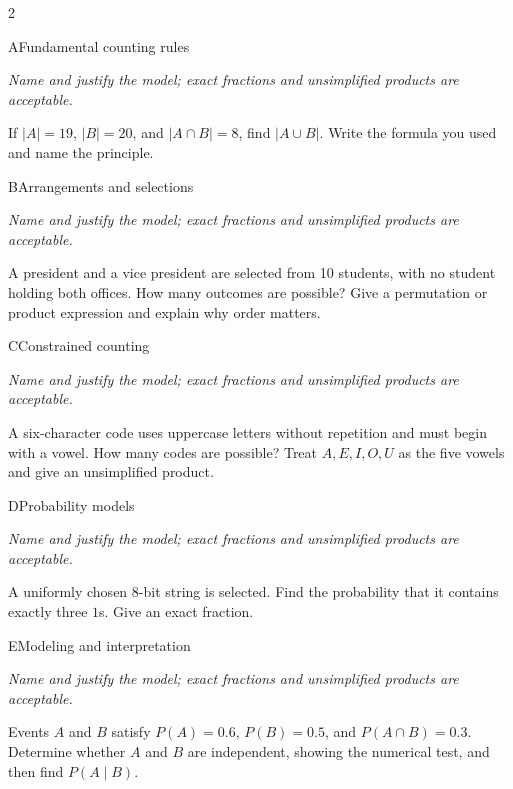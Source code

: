 \documentclass[9pt]{extarticle}
\begin{document}
\CoreWorkArea
\FormBreak
{}
\begin{multicols}{2}
\begin{CoreProblem}{A}{Fundamental counting rules}
{\scriptsize\textit{Name and justify the model; exact fractions and unsimplified products are acceptable.}\par}
If $|A|=19$, $|B|=20$, and $|A\cap B|=8$, find $|A\cup B|$. Write
    the formula you used and name the principle.
\end{CoreProblem}
\begin{CoreProblem}{B}{Arrangements and selections}
{\scriptsize\textit{Name and justify the model; exact fractions and unsimplified products are acceptable.}\par}
A president and a vice president are selected from 10 students, with
    no student holding both offices. How many outcomes are possible? Give a
    permutation or product expression and explain why order matters.
\end{CoreProblem}
\begin{CoreProblem}{C}{Constrained counting}
{\scriptsize\textit{Name and justify the model; exact fractions and unsimplified products are acceptable.}\par}
A six-character code uses uppercase letters without repetition and
    must begin with a vowel. How many codes are possible? Treat
    $A,E,I,O,U$ as the five vowels and give an unsimplified product.
\end{CoreProblem}
\columnbreak
\begin{CoreProblem}{D}{Probability models}
{\scriptsize\textit{Name and justify the model; exact fractions and unsimplified products are acceptable.}\par}
A uniformly chosen 8-bit string is selected. Find the probability
    that it contains exactly three $1$s. Give an exact fraction.
\end{CoreProblem}
\begin{CoreProblem}{E}{Modeling and interpretation}
{\scriptsize\textit{Name and justify the model; exact fractions and unsimplified products are acceptable.}\par}
Events $A$ and $B$ satisfy $P(A)=0.6$, $P(B)=0.5$, and
    $P(A\cap B)=0.3$. Determine whether $A$ and $B$ are independent, showing
    the numerical test, and then find $P(A\mid B)$.
\end{CoreProblem}
\end{multicols}
\CoreWorkArea
\FormBreak
{}
\end{document}
